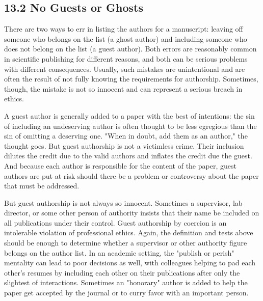 \subsection*{13.2 No Guests or Ghosts}
There are two ways to err in listing the authors for a manuscript: leaving off someone who belongs on the list (a ghost author) and including someone who does not belong on the list (a guest author). Both errors are reasonably common in scientific publishing for different reasons, and both can be serious problems with different consequences. Usually, such mistakes are unintentional and are often the result of not fully knowing the requirements for authorship. Sometimes, though, the mistake is not so innocent and can represent a serious breach in ethics.

A guest author is generally added to a paper with the best of intentions: the sin of including an undeserving author is often thought to be less egregious than the sin of omitting a deserving one. "When in doubt, add them as an author," the thought goes. But guest authorship is not a victimless crime. Their inclusion dilutes the credit due to the valid authors and inflates the credit due the guest. And because each author is responsible for the content of the paper, guest authors are put at risk should there be a problem or controversy about the paper that must be addressed.

But guest authorship is not always so innocent. Sometimes a supervisor, lab director, or some other person of authority insists that their name be included on all publications under their control. Guest authorship by coercion is an intolerable violation of professional ethics. Again, the definition and tests above should be enough to determine whether a supervisor or other authority figure belongs on the author list. In an academic setting, the "publish or perish" mentality can lead to poor decisions as well, with colleagues helping to pad each other's resumes by including each other on their publications after only the slightest of interactions. Sometimes an "honorary" author is added to help the paper get accepted by the journal or to curry favor with an important person.

